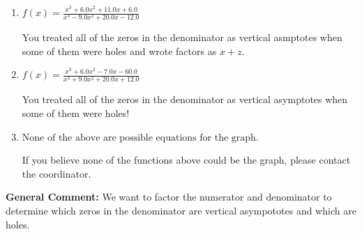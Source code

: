 \documentclass{extbook}[14pt]
\begin{document}
\begin{enumerate}
{\begin{enumerate}[label=\Alph*.]
Remember that factors are written as $x-z$. For example, the zero $x=-1$ corresponds to the factor $x-(-1)$.
\item \( f(x)=\frac{x^{3} +6.0 x^{2} +11.0 x + 6.0}{x^{3} -9.0 x^{2} +20.0 x -12.0} \)

You treated all of the zeros in the denominator as vertical asmptotes when some of them were holes and wrote factors as $x+z$.
\item \( f(x)=\frac{x^{3} +6.0 x^{2} -7.0 x -60.0}{x^{3} +9.0 x^{2} +20.0 x + 12.0} \)

You treated all of the zeros in the denominator as vertical asymptotes when some of them were holes!
\item \( \text{None of the above are possible equations for the graph.} \)

If you believe none of the functions above could be the graph, please contact the coordinator.
\end{enumerate}

\textbf{General Comment:} We want to factor the numerator and denominator to determine which zeros in the denominator are vertical asympototes and which are holes.
}
\end{enumerate}
\end{document}
